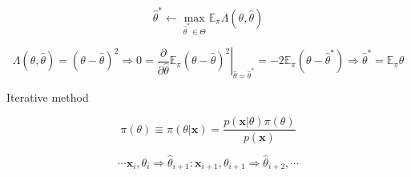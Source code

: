 \documentclass[12pt, twoside, draft]{article}
\begin{document}
\begin{equation}
\hat{\theta}^* \leftarrow \max_{\hat{\theta}^* \in \Theta} \mathbb{E}_\pi \Lambda(\theta, \hat{\theta})
\end{equation}


\begin{equation}
\Lambda(\theta, \hat{\theta}) = (\theta - \hat{\theta})^2 \Rightarrow
0 = \left. \frac{\partial}{\partial \hat{\theta}} \mathbb{E}_\pi  (\theta - \hat{\theta})^2 \right|_{\hat{\theta} = \hat{\theta}^*}
= -2 \mathbb{E}_\pi (\theta - \hat{\theta}^*)
\Rightarrow \hat{\theta}^* = \mathbb{E}_\pi \theta
\end{equation}

Iterative method
 
\begin{equation}
\pi(\theta) \equiv \pi(\theta | \mathbf{x}) = \frac{p(\mathbf{x} | \theta) \pi(\theta)}{p(\mathbf{x})}
\end{equation}

\begin{equation}
\cdots \mathbf{x}_i, \theta_i \Rightarrow \hat{\theta}_{i+1} : \mathbf{x}_{i + 1}, \theta_{i+1} \Rightarrow \hat{\theta}_{i+2}, \cdots
\end{equation}
\end{document}
